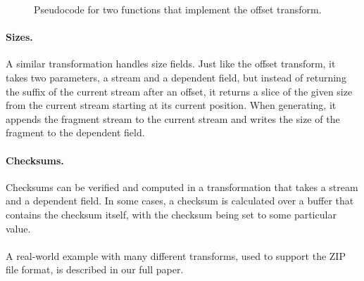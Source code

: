 \begin{figure}[h]
\smaller[0.5]

\caption{Pseudocode for two functions that implement the offset transform.}
\label{fig:xform-sig}
\end{figure}

\paragraph{Sizes.}
A similar transformation handles size fields. Just like the offset transform, it takes two parameters, a
stream and a dependent field, but instead of returning the suffix of the current stream after an
offset, it returns a slice of the given size from the current stream starting at its current
position. When generating, it appends the fragment stream to the current stream and writes the size
of the fragment to the dependent field.

\paragraph{Checksums.}
Checksums can be verified and computed in a transformation that takes a stream and a dependent
field. In some cases, a checksum is calculated over a buffer that contains the checksum itself, with
the checksum being set to some particular value. 

\paragraph{}
A real-world example with many different transforms, used to support
the ZIP file format, is described in our full paper.%







